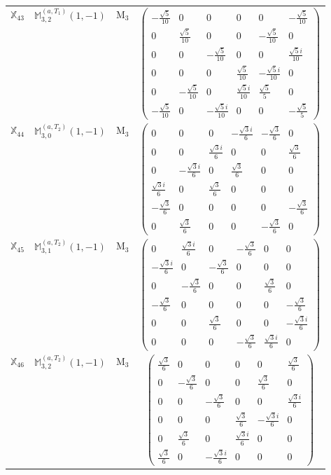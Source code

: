 \documentclass[fleqn,10pt,landscape]{article}
\begin{document}
\begin{itemize}
\begin{center}
\begin{longtable}{c|c|c|c}
$ \mathbb{X}_{43} $ & $\mathbb{M}_{3,2}^{(a,T_{1})}(1,-1)$ & M$_{3}$ & $\begin{pmatrix} - \frac{\sqrt{5}}{10} & 0 & 0 & 0 & 0 & - \frac{\sqrt{5}}{10} \\ 0 & \frac{\sqrt{5}}{10} & 0 & 0 & - \frac{\sqrt{5}}{10} & 0 \\ 0 & 0 & - \frac{\sqrt{5}}{10} & 0 & 0 & \frac{\sqrt{5} i}{10} \\ 0 & 0 & 0 & \frac{\sqrt{5}}{10} & - \frac{\sqrt{5} i}{10} & 0 \\ 0 & - \frac{\sqrt{5}}{10} & 0 & \frac{\sqrt{5} i}{10} & \frac{\sqrt{5}}{5} & 0 \\ - \frac{\sqrt{5}}{10} & 0 & - \frac{\sqrt{5} i}{10} & 0 & 0 & - \frac{\sqrt{5}}{5} \end{pmatrix}$ \\
$ \mathbb{X}_{44} $ & $\mathbb{M}_{3,0}^{(a,T_{2})}(1,-1)$ & M$_{3}$ & $\begin{pmatrix} 0 & 0 & 0 & - \frac{\sqrt{3} i}{6} & - \frac{\sqrt{3}}{6} & 0 \\ 0 & 0 & \frac{\sqrt{3} i}{6} & 0 & 0 & \frac{\sqrt{3}}{6} \\ 0 & - \frac{\sqrt{3} i}{6} & 0 & \frac{\sqrt{3}}{6} & 0 & 0 \\ \frac{\sqrt{3} i}{6} & 0 & \frac{\sqrt{3}}{6} & 0 & 0 & 0 \\ - \frac{\sqrt{3}}{6} & 0 & 0 & 0 & 0 & - \frac{\sqrt{3}}{6} \\ 0 & \frac{\sqrt{3}}{6} & 0 & 0 & - \frac{\sqrt{3}}{6} & 0 \end{pmatrix}$ \\
$ \mathbb{X}_{45} $ & $\mathbb{M}_{3,1}^{(a,T_{2})}(1,-1)$ & M$_{3}$ & $\begin{pmatrix} 0 & \frac{\sqrt{3} i}{6} & 0 & - \frac{\sqrt{3}}{6} & 0 & 0 \\ - \frac{\sqrt{3} i}{6} & 0 & - \frac{\sqrt{3}}{6} & 0 & 0 & 0 \\ 0 & - \frac{\sqrt{3}}{6} & 0 & 0 & \frac{\sqrt{3}}{6} & 0 \\ - \frac{\sqrt{3}}{6} & 0 & 0 & 0 & 0 & - \frac{\sqrt{3}}{6} \\ 0 & 0 & \frac{\sqrt{3}}{6} & 0 & 0 & - \frac{\sqrt{3} i}{6} \\ 0 & 0 & 0 & - \frac{\sqrt{3}}{6} & \frac{\sqrt{3} i}{6} & 0 \end{pmatrix}$ \\
$ \mathbb{X}_{46} $ & $\mathbb{M}_{3,2}^{(a,T_{2})}(1,-1)$ & M$_{3}$ & $\begin{pmatrix} \frac{\sqrt{3}}{6} & 0 & 0 & 0 & 0 & \frac{\sqrt{3}}{6} \\ 0 & - \frac{\sqrt{3}}{6} & 0 & 0 & \frac{\sqrt{3}}{6} & 0 \\ 0 & 0 & - \frac{\sqrt{3}}{6} & 0 & 0 & \frac{\sqrt{3} i}{6} \\ 0 & 0 & 0 & \frac{\sqrt{3}}{6} & - \frac{\sqrt{3} i}{6} & 0 \\ 0 & \frac{\sqrt{3}}{6} & 0 & \frac{\sqrt{3} i}{6} & 0 & 0 \\ \frac{\sqrt{3}}{6} & 0 & - \frac{\sqrt{3} i}{6} & 0 & 0 & 0 \end{pmatrix}$ \\

\end{longtable}
\end{center}
\end{itemize}
\end{document}
